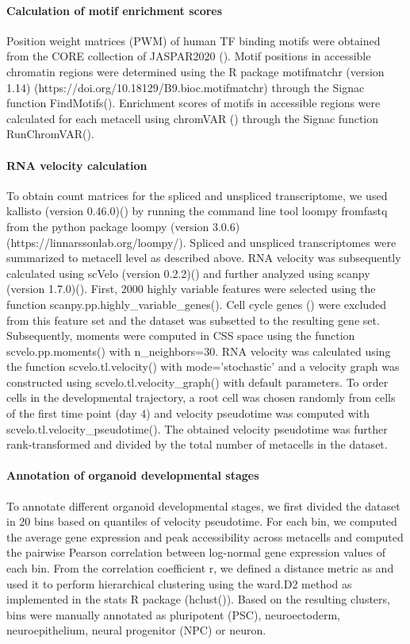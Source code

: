 \paragraph{Calculation of motif enrichment scores}
Position weight matrices (PWM) of human TF binding motifs were obtained from the CORE collection of JASPAR2020 (\cite{fornes_jaspar_2020}). Motif positions in accessible chromatin regions were determined using the R package motifmatchr (version 1.14) (https://doi.org/10.18129/B9.bioc.motifmatchr) through the Signac function FindMotifs(). Enrichment scores of motifs in accessible regions were calculated for each metacell using chromVAR (\cite{schep_chromvar_2017}) through the Signac function RunChromVAR().
 
\paragraph{RNA velocity calculation}
To obtain count matrices for the spliced and unspliced transcriptome, we used kallisto (version 0.46.0)(\cite{bray_near-optimal_2016}) by running the command line tool loompy fromfastq  from the python package loompy (version 3.0.6)(https://linnarssonlab.org/loompy/). Spliced and unspliced transcriptomes were summarized to metacell level as described above. RNA velocity was subsequently calculated using scVelo (version 0.2.2)(\cite{bergen_generalizing_2020}) and further analyzed using scanpy (version 1.7.0)(\cite{wolf_scanpy_2018}). First, 2000 highly variable features were selected using the function scanpy.pp.highly\_variable\_genes(). Cell cycle genes (\cite{tirosh_dissecting_2016}) were excluded from this feature set and the dataset was subsetted to the resulting gene set. Subsequently, moments were computed in CSS space using the function scvelo.pp.moments() with n\_neighbors=30. RNA velocity was calculated using the function scvelo.tl.velocity() with mode=’stochastic’ and a velocity graph was constructed using scvelo.tl.velocity\_graph() with default parameters. To order cells in the developmental trajectory, a root cell was chosen randomly from cells of the first time point (day 4) and velocity pseudotime was computed with scvelo.tl.velocity\_pseudotime().  The obtained velocity pseudotime was further rank-transformed and divided by the total number of metacells in the dataset.
 
\paragraph{Annotation of organoid developmental stages}
To annotate different organoid developmental stages, we first divided the dataset in 20 bins based on quantiles of velocity pseudotime. For each bin, we computed the average gene expression and peak accessibility across metacells and computed the pairwise Pearson correlation between log-normal gene expression values of each bin. From the correlation coefficient r, we defined a distance metric as  and used it to perform hierarchical clustering using the ward.D2 method as implemented in the stats R package (hclust()). Based on the resulting clusters, bins were manually annotated as pluripotent (PSC), neuroectoderm, neuroepithelium, neural progenitor (NPC) or neuron.
 
